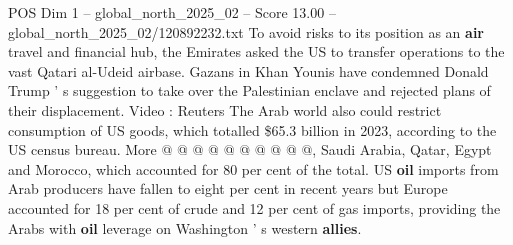 \begin{textsample}{POS Dim 1 – global\_north\_2025\_02 – Score 13.00 – global\_north\_2025\_02/120892232.txt}
To avoid risks to its position as an \textbf{air} travel and financial hub, the Emirates asked the US to transfer operations to the vast Qatari al-Udeid airbase.
Gazans in Khan Younis have condemned Donald Trump ' s suggestion to take over the Palestinian enclave and rejected plans of their displacement.
Video : Reuters The Arab world also could restrict consumption of US goods, which totalled \$65.3 billion in 2023, according to the US census bureau.
More @ @ @ @ @ @ @ @ @ @, Saudi Arabia, Qatar, Egypt and Morocco, which accounted for 80 per cent of the total.
US \textbf{oil} imports from Arab producers have fallen to eight per cent in recent years but Europe accounted for 18 per cent of crude and 12 per cent of gas imports, providing the Arabs with \textbf{oil} leverage on Washington ' s western \textbf{allies}.

\end{textsample}
